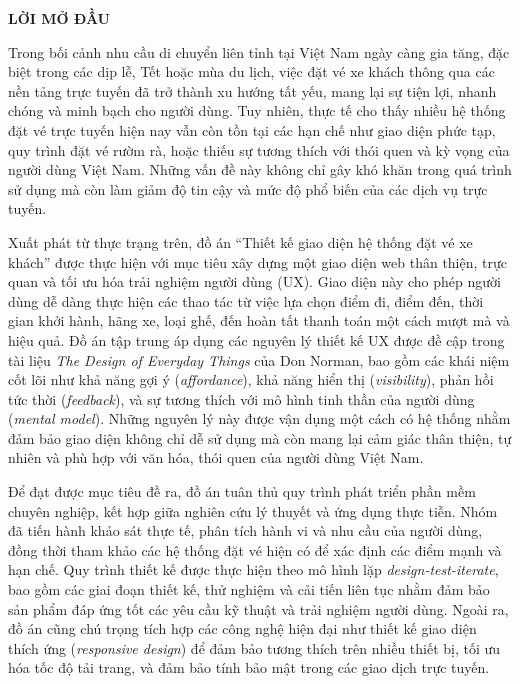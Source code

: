 \newpage
\begin{center}
    {\large\textbf{LỜI MỞ ĐẦU}}
\end{center}
\onehalfspacing



Trong bối cảnh nhu cầu di chuyển liên tỉnh tại Việt Nam ngày càng gia tăng, đặc biệt trong các dịp lễ, Tết hoặc mùa du lịch, việc đặt vé xe khách thông qua các nền tảng trực tuyến đã trở thành xu hướng tất yếu, mang lại sự tiện lợi, nhanh chóng và minh bạch cho người dùng. Tuy nhiên, thực tế cho thấy nhiều hệ thống đặt vé trực tuyến hiện nay vẫn còn tồn tại các hạn chế như giao diện phức tạp, quy trình đặt vé rườm rà, hoặc thiếu sự tương thích với thói quen và kỳ vọng của người dùng Việt Nam. Những vấn đề này không chỉ gây khó khăn trong quá trình sử dụng mà còn làm giảm độ tin cậy và mức độ phổ biến của các dịch vụ trực tuyến.

Xuất phát từ thực trạng trên, đồ án ``Thiết kế giao diện hệ thống đặt vé xe khách'' được thực hiện với mục tiêu xây dựng một giao diện web thân thiện, trực quan và tối ưu hóa trải nghiệm người dùng (UX). Giao diện này cho phép người dùng dễ dàng thực hiện các thao tác từ việc lựa chọn điểm đi, điểm đến, thời gian khởi hành, hãng xe, loại ghế, đến hoàn tất thanh toán một cách mượt mà và hiệu quả. Đồ án tập trung áp dụng các nguyên lý thiết kế UX được đề cập trong tài liệu \textit{The Design of Everyday Things} của Don Norman, bao gồm các khái niệm cốt lõi như khả năng gợi ý (\textit{affordance}), khả năng hiển thị (\textit{visibility}), phản hồi tức thời (\textit{feedback}), và sự tương thích với mô hình tinh thần của người dùng (\textit{mental model}). Những nguyên lý này được vận dụng một cách có hệ thống nhằm đảm bảo giao diện không chỉ dễ sử dụng mà còn mang lại cảm giác thân thiện, tự nhiên và phù hợp với văn hóa, thói quen của người dùng Việt Nam.

Để đạt được mục tiêu đề ra, đồ án tuân thủ quy trình phát triển phần mềm chuyên nghiệp, kết hợp giữa nghiên cứu lý thuyết và ứng dụng thực tiễn. Nhóm đã tiến hành khảo sát thực tế, phân tích hành vi và nhu cầu của người dùng, đồng thời tham khảo các hệ thống đặt vé hiện có để xác định các điểm mạnh và hạn chế. Quy trình thiết kế được thực hiện theo mô hình lặp \textit{design-test-iterate}, bao gồm các giai đoạn thiết kế, thử nghiệm và cải tiến liên tục nhằm đảm bảo sản phẩm đáp ứng tốt các yêu cầu kỹ thuật và trải nghiệm người dùng. Ngoài ra, đồ án cũng chú trọng tích hợp các công nghệ hiện đại như thiết kế giao diện thích ứng (\textit{responsive design}) để đảm bảo tương thích trên nhiều thiết bị, tối ưu hóa tốc độ tải trang, và đảm bảo tính bảo mật trong các giao dịch trực tuyến.

